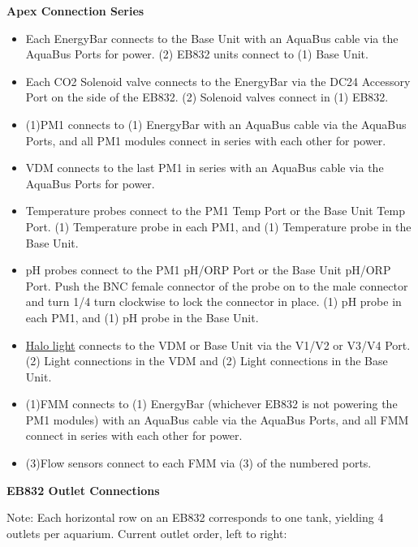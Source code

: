 \documentclass[
]{book}
\providecommand{\tightlist}{%
  \setlength{\itemsep}{0pt}\setlength{\parskip}{0pt}}
\begin{document}
\textbf{Apex Connection Series}

\begin{itemize}
\tightlist
\item
  Each EnergyBar connects to the Base Unit with an AquaBus cable via the AquaBus Ports for power. (2) EB832 units connect to (1) Base Unit.\\
\item
  Each CO2 Solenoid valve connects to the EnergyBar via the DC24 Accessory Port on the side of the EB832. (2) Solenoid valves connect in (1) EB832.\\
\item
  (1)PM1 connects to (1) EnergyBar with an AquaBus cable via the AquaBus Ports, and all PM1 modules connect in series with each other for power.\\
\item
  VDM connects to the last PM1 in series with an AquaBus cable via the AquaBus Ports for power.\\
\item
  Temperature probes connect to the PM1 Temp Port or the Base Unit Temp Port. (1) Temperature probe in each PM1, and (1) Temperature probe in the Base Unit.\\
\item
  pH probes connect to the PM1 pH/ORP Port or the Base Unit pH/ORP Port. Push the BNC female connector of the probe on to the male connector and turn 1/4 turn clockwise to lock the connector in place. (1) pH probe in each PM1, and (1) pH probe in the Base Unit.\\
\item
  \href{https://github.com/SilbigerLab/Mesocosm_User_Manual/tree/394a3f7d9fed8765e4152f9fdd11d00a2ea87a93/Manuals/HALO_Quick_Start_Guide.pdf}{Halo light} connects to the VDM or Base Unit via the V1/V2 or V3/V4 Port. (2) Light connections in the VDM and (2) Light connections in the Base Unit.\\
\item
  (1)FMM connects to (1) EnergyBar (whichever EB832 is not powering the PM1 modules) with an AquaBus cable via the AquaBus Ports, and all FMM connect in series with each other for power.\\
\item
  (3)Flow sensors connect to each FMM via (3) of the numbered ports.
\end{itemize}

\textbf{EB832 Outlet Connections}

Note: Each horizontal row on an EB832 corresponds to one tank, yielding 4 outlets per aquarium. Current outlet order, left to right:
\end{document}
